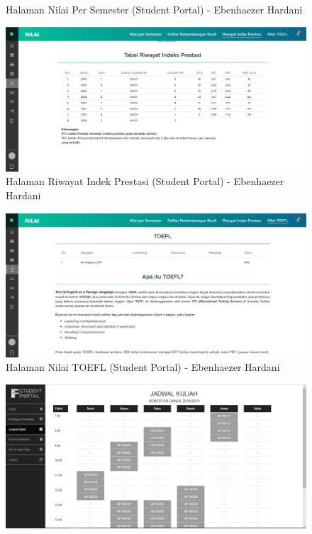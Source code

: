 \begin{itemize}
\begin{enumerate}
\begin{figure}[H]
			\caption{Halaman Nilai Per Semester (Student Portal) - Ebenhaezer Hardani}
			\label{fig:2015_1_nps_studentportal}
		\end{figure}
		\begin{figure}[H]
			\centering
			\includegraphics[scale=0.45]{Gambar/HasilPengujian/2015_1_rip_studentportal}
			\caption{Halaman Riwayat Indek Prestasi (Student Portal) - Ebenhaezer Hardani}
			\label{fig:2015_1_rip_studentportal}
		\end{figure}
		\begin{figure}[H]
			\centering
			\includegraphics[scale=0.45]{Gambar/HasilPengujian/2015_1_toefl_studentportal}
			\caption{Halaman Nilai TOEFL (Student Portal) - Ebenhaezer Hardani}
			\label{fig:2015_1_toefl_studentportal}
		\end{figure}
		\begin{figure}[H]
			\centering
			\includegraphics[scale=0.45]{Gambar/HasilPengujian/2015_1_jadwal_kuliah_ifstudentportal}

\end{figure}
\end{enumerate}
\end{itemize}
